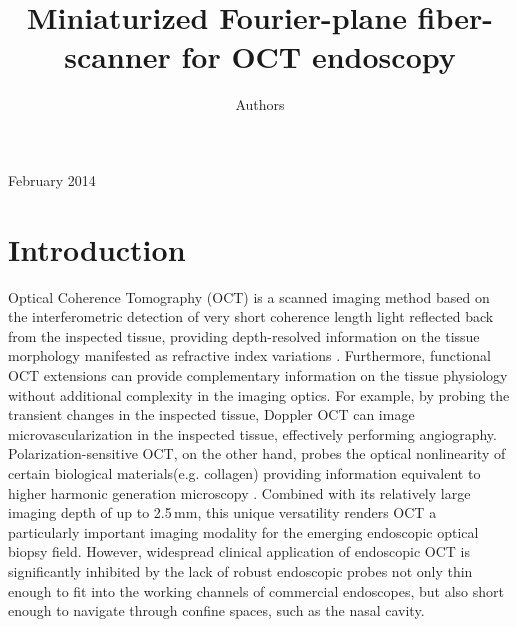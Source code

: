 \documentclass[10pt]{iopart}
\begin{document}
\title[Miniaturized Fourier-plane fiber-scanner for OCT endoscopy]{Miniaturized Fourier-plane fiber-scanner for OCT endoscopy}

\author{Authors}

\address{Address}
\vspace{10pt}
\begin{indented}
\item[]February 2014
\end{indented}

\begin{abstract}


\end{abstract}
%
%
%
% 
\ioptwocol
%

\section{Introduction}
Optical Coherence Tomography (OCT) is a scanned imaging method based on the interferometric detection of very short coherence length light reflected back from the inspected tissue, providing depth-resolved information on the tissue morphology manifested as refractive index variations \cite{}.  Furthermore, functional OCT extensions can provide complementary information on the tissue physiology without additional complexity in the imaging optics. For example, by probing the transient changes in the inspected tissue, Doppler OCT can image microvascularization in the inspected tissue, effectively performing angiography. Polarization-sensitive OCT, on the other hand, probes the optical nonlinearity of certain biological materials(e.g. collagen) providing information equivalent to higher harmonic generation microscopy \cite{}. Combined with its relatively large imaging depth of up to 2.5\,mm, this unique versatility renders OCT a particularly important imaging modality for the emerging endoscopic optical biopsy field. However, widespread clinical application of endoscopic OCT is significantly inhibited by the lack of robust endoscopic probes not only thin enough to fit into the working channels of commercial endoscopes, but also short enough to navigate through confine spaces, such as the nasal cavity.
\end{document}
